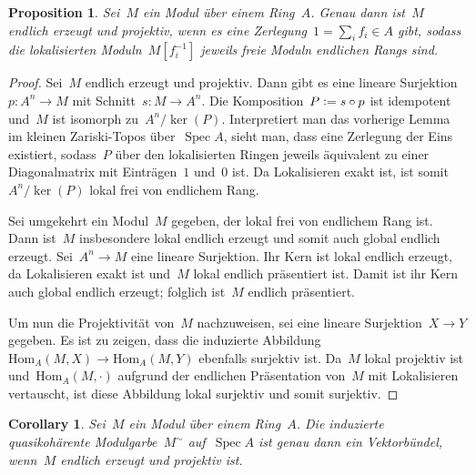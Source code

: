 \documentclass[12pt]{scrartcl}
\theoremstyle{definition}
\theoremstyle{plain}
\newtheorem*{prop}{Proposition}
\newtheorem*{cor}{Corollary}
\theoremstyle{remark}
\newcommand{\defeq}{\vcentcolon=}
\newcommand{\Hom}{\mathrm{Hom}}
\begin{document}
\begin{prop}Sei~$M$ ein Modul über einem Ring~$A$. Genau dann ist~$M$
endlich erzeugt und projektiv, wenn es eine Zerlegung~$1 = \sum_i f_i \in A$
gibt, sodass die lokalisierten Moduln~$M[f_i^{-1}]$ jeweils freie Moduln
endlichen Rangs sind.\end{prop}

\begin{proof}Sei~$M$ endlich erzeugt und projektiv. Dann gibt es eine lineare
Surjektion~$p : A^n \to M$ mit Schnitt~$s : M \to A^n$. Die Komposition~$P
\defeq s \circ p$ ist idempotent und~$M$ ist isomorph zu~$A^n/\operatorname{ker}(P)$.
Interpretiert man das vorherige Lemma im kleinen Zariski-Topos
über~$\operatorname{Spec} A$, sieht man, dass eine Zerlegung der Eins
existiert, sodass~$P$ über den lokalisierten Ringen jeweils äquivalent zu einer
Diagonalmatrix mit Einträgen~$1$ und~$0$ ist. Da Lokalisieren exakt ist, ist
somit~$A^n/\operatorname{ker}(P)$ lokal frei von endlichem Rang.

Sei umgekehrt ein Modul~$M$ gegeben, der lokal frei von endlichem Rang ist.
Dann ist~$M$ insbesondere lokal endlich erzeugt und somit auch global endlich erzeugt. Sei~$A^n \to M$ eine lineare
Surjektion. Ihr Kern ist lokal endlich erzeugt, da Lokalisieren exakt ist
und~$M$ lokal endlich präsentiert ist. Damit ist ihr Kern auch global endlich
erzeugt; folglich ist~$M$ endlich präsentiert.

Um nun die Projektivität
von~$M$ nachzuweisen, sei eine lineare Surjektion~$X \to Y$ gegeben. Es ist zu
zeigen, dass die induzierte Abbildung~$\Hom_A(M,X) \to \Hom_A(M,Y)$ ebenfalls
surjektiv ist. Da~$M$ lokal projektiv ist und~$\Hom_A(M,\cdot)$ aufgrund der
endlichen Präsentation von~$M$ mit Lokalisieren vertauscht, ist diese Abbildung
lokal surjektiv und somit surjektiv.
\end{proof}

\begin{cor}Sei~$M$ ein Modul über einem Ring~$A$. Die induzierte
quasikohärente Modulgarbe~$M^\sim$ auf~$\operatorname{Spec} A$ ist genau dann ein Vektorbündel, wenn~$M$
endlich erzeugt und projektiv ist.\end{cor}

\end{document}

